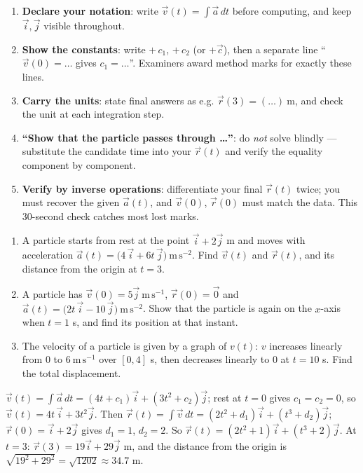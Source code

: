 \documentclass[11pt]{article}
\begin{document}
\begin{methode}
\begin{enumerate}
\item \textbf{Declare your notation}: write $\vec{v}(t)=\int\vec{a}\,dt$ before computing, and keep $\vec{i},\vec{j}$ visible throughout.
\item \textbf{Show the constants}: write $+\,c_1$, $+\,c_2$ (or $+\vec{c}$), then a separate line ``$\vec{v}(0)=\ldots$ gives $c_1=\ldots$''. Examiners award method marks for exactly these lines.
\item \textbf{Carry the units}: state final answers as e.g. $\vec{r}(3)=(\ldots)\ \mathrm{m}$, and check the unit at each integration step.
\item \textbf{``Show that the particle passes through \ldots''}: do \emph{not} solve blindly — substitute the candidate time into your $\vec{r}(t)$ and verify the equality component by component.
\item \textbf{Verify by inverse operations}: differentiate your final $\vec{r}(t)$ twice; you must recover the given $\vec{a}(t)$, and $\vec{v}(0)$, $\vec{r}(0)$ must match the data. This 30-second check catches most lost marks.
\end{enumerate}
\end{methode}

\begin{exercice}[Practice]
\begin{enumerate}
\item A particle starts from rest at the point $\vec{i}+2\vec{j}$ m and moves with acceleration $\vec{a}(t)=\bigl(4\,\vec{i}+6t\,\vec{j}\bigr)\ \mathrm{m\,s^{-2}}$. Find $\vec{v}(t)$ and $\vec{r}(t)$, and its distance from the origin at $t=3$.
\item A particle has $\vec{v}(0)=5\vec{j}\ \mathrm{m\,s^{-1}}$, $\vec{r}(0)=\vec{0}$ and $\vec{a}(t)=\bigl(2t\,\vec{i}-10\,\vec{j}\bigr)\ \mathrm{m\,s^{-2}}$. Show that the particle is again on the $x$-axis when $t=1$ s, and find its position at that instant.
\item The velocity of a particle is given by a graph of $v(t)$: $v$ increases linearly from $0$ to $6\ \mathrm{m\,s^{-1}}$ over $[0,4]$ s, then decreases linearly to $0$ at $t=10$ s. Find the total displacement.
\end{enumerate}
\end{exercice}

\begin{corrige}[Exercise 1]
$\vec{v}(t)=\int\vec{a}\,dt=(4t+c_1)\vec{i}+(3t^{2}+c_2)\vec{j}$; rest at $t=0$ gives $c_1=c_2=0$, so $\vec{v}(t)=4t\,\vec{i}+3t^{2}\vec{j}$. Then $\vec{r}(t)=\int\vec{v}\,dt=(2t^{2}+d_1)\vec{i}+(t^{3}+d_2)\vec{j}$; $\vec{r}(0)=\vec{i}+2\vec{j}$ gives $d_1=1$, $d_2=2$. So $\vec{r}(t)=(2t^{2}+1)\vec{i}+(t^{3}+2)\vec{j}$. At $t=3$: $\vec{r}(3)=19\vec{i}+29\vec{j}$ m, and the distance from the origin is $\sqrt{19^{2}+29^{2}}=\sqrt{1202}\approx 34.7$ m.
\end{corrige}
\end{document}
